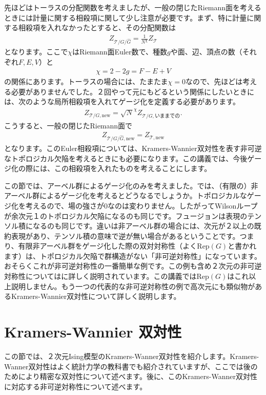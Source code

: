 \documentclass[report,paper=a4, fontsize=12pt, line_length=16cm, number_of_lines=33,dvipdfmx]{jlreq}
\numberwithin{equation}{chapter}
\newcommand{\Gh}{\widehat{G}}
\newcommand{\Tcal}{\mathcal{T}}
\begin{document}
先ほどはトーラスの分配関数を考えましたが、一般の閉じたRiemann面を考えるときには計量に関する相殺項に関して少し注意が必要です。まず、特に計量に関する相殺項を入れなかったとすると、その分配関数は
\begin{align}
  Z_{\Tcal/G/\Gh}=\frac{1}{N^{\chi}}Z_{\Tcal}
\end{align}
となります。ここで$\chi$はRiemann面Euler数で、種数$g$や面、辺、頂点の数（それぞれ$F,E,V$）と
\begin{align}
  \chi=2-2g=F-E+V
\end{align}
の関係にあります。トーラスの場合には、たまたま$\chi=0$なので、先ほどは考える必要がありませんでした。２回やって元にもどるという関係にしたいときには、次のような局所相殺項を入れてゲージ化を定義する必要があります。
\begin{align}
  Z_{\Tcal/G,\text{new}}=\sqrt{N}^{\chi}Z_{\Tcal/G, \text{いままでの}}.\label{Eulercounterterm}
\end{align}
こうすると、一般の閉じたRiemann面で
\begin{align}
  Z_{\Tcal/G/\Gh,\text{new}}=Z_{\Tcal,\text{new}}
\end{align}
となります。このEuler相殺項については、Kramers-Wannier双対性を表す非可逆なトポロジカル欠陥を考えるときにも必要になります。この講義では、今後ゲージ化の際には、この相殺項を入れたものを考えることにします。

この節では、アーベル群によるゲージ化のみを考えました。では、（有限の）非アーベル群によるゲージ化を考えるとどうなるでしょうか。トポロジカルなゲージ化を考えるので、場の強さが$0$なのは変わりません。したがってWilsonループが余次元１のトポロジカル欠陥になるのも同じです。フュージョンは表現のテンソル積になるのも同じです。違いは非アーベル群の場合には、次元が２以上の既約表現があり、テンソル積の意味で逆が無い場合があるということです。つまり、有限非アーベル群をゲージ化した際の双対対称性（よく$\mathrm{Rep}(G)$と書かれます）は、トポロジカル欠陥で群構造がない「非可逆対称性」になっています。おそらくこれが非可逆対称性の一番簡単な例です。この例も含め２次元の非可逆対称性については\cite{Bhardwaj:2017xup}に詳しく説明されています。この講義では$\mathrm{Rep}(G)$はこれ以上説明しません。もう一つの代表的な非可逆対称性の例で高次元にも類似物があるKramers-Wannier双対性について詳しく説明します。

\section{Kramers-Wannier 双対性}
この節では、２次元Ising模型のKramers-Wanner双対性を紹介します。Kramers-Wanner双対性はよく統計力学の教科書でも紹介されていますが、ここでは後のためにより精密な双対性について述べます。後に、このKramers-Wanner双対性に対応する非可逆対称性について述べます。
\end{document}
